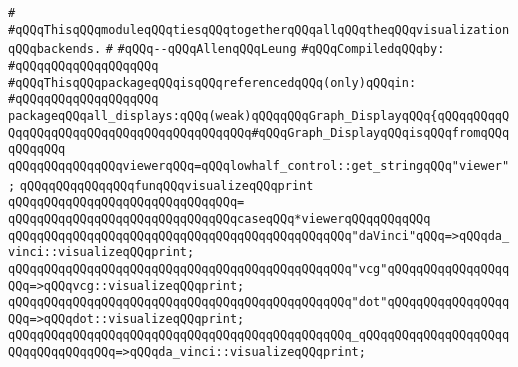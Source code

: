 \label{src/lib/compiler/back/low/display/all-displays.pkg}
\verb|#|\newline
\verb|#qQQqThisqQQqmoduleqQQqtiesqQQqtogetherqQQqallqQQqtheqQQqvisualizationqQQqbackends.|\newline
\verb|#|\newline
\verb|#qQQq--qQQqAllenqQQqLeung|\newline
\newline
\verb|#qQQqCompiledqQQqby:|\newline
\verb|#qQQqqQQqqQQqqQQqqQQq|\newline
\newline
\verb|#qQQqThisqQQqpackageqQQqisqQQqreferencedqQQq(only)qQQqin:|\newline
\verb|#qQQqqQQqqQQqqQQqqQQq|\newline
\newline
\verb|packageqQQqall_displays:qQQq(weak)qQQqqQQqGraph_DisplayqQQq{qQQqqQQqqQQqqQQqqQQqqQQqqQQqqQQqqQQqqQQqqQQq#qQQqGraph_DisplayqQQqisqQQqfromqQQqqQQqqQQq|\newline
\newline
\verb|qQQqqQQqqQQqqQQqviewerqQQq=qQQqlowhalf_control::get_stringqQQq"viewer";|\newline
\newline
\verb|qQQqqQQqqQQqqQQqfunqQQqvisualizeqQQqprint|\newline
\verb|qQQqqQQqqQQqqQQqqQQqqQQqqQQqqQQq=|\newline
\verb|qQQqqQQqqQQqqQQqqQQqqQQqqQQqqQQqcaseqQQq*viewerqQQqqQQqqQQq|\newline
\verb|qQQqqQQqqQQqqQQqqQQqqQQqqQQqqQQqqQQqqQQqqQQqqQQq"daVinci"qQQq=>qQQqda_vinci::visualizeqQQqprint;|\newline
\verb|qQQqqQQqqQQqqQQqqQQqqQQqqQQqqQQqqQQqqQQqqQQqqQQq"vcg"qQQqqQQqqQQqqQQqqQQq=>qQQqvcg::visualizeqQQqprint;|\newline
\verb|qQQqqQQqqQQqqQQqqQQqqQQqqQQqqQQqqQQqqQQqqQQqqQQq"dot"qQQqqQQqqQQqqQQqqQQq=>qQQqdot::visualizeqQQqprint;|\newline
\verb|qQQqqQQqqQQqqQQqqQQqqQQqqQQqqQQqqQQqqQQqqQQqqQQq_qQQqqQQqqQQqqQQqqQQqqQQqqQQqqQQqqQQq=>qQQqda_vinci::visualizeqQQqprint;|\newline
